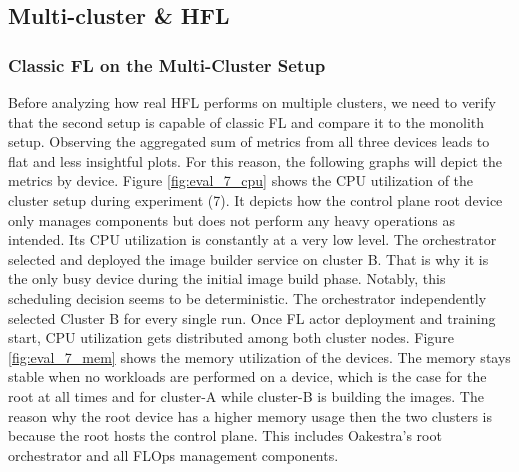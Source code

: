 \subsection{Multi-cluster \& HFL} \label{subsection:eval_multicluster_hfl}

\subsubsection{Classic FL on the Multi-Cluster Setup}

Before analyzing how real HFL performs on multiple clusters, we need to verify that the second setup is capable of classic FL and compare it to the monolith setup.
Observing the aggregated sum of metrics from all three devices leads to flat and less insightful plots.
For this reason, the following graphs will depict the metrics by device.
Figure \ref{fig:eval_7_cpu} shows the CPU utilization of the cluster setup during experiment (7).
It depicts how the control plane root device only manages components but does not perform any heavy operations as intended.
Its CPU utilization is constantly at a very low level.
The orchestrator selected and deployed the image builder service on cluster B.
That is why it is the only busy device during the initial image build phase.
Notably, this scheduling decision seems to be deterministic.
The orchestrator independently selected Cluster B for every single run.
Once FL actor deployment and training start, CPU utilization gets distributed among both cluster nodes.
Figure \ref{fig:eval_7_mem} shows the memory utilization of the devices.
The memory stays stable when no workloads are performed on a device, which is the case for the root at all times and for cluster-A while cluster-B is building the images. 
The reason why the root device has a higher memory usage then the two clusters is because the root hosts the control plane.
This includes Oakestra's root orchestrator and all FLOps management components.


